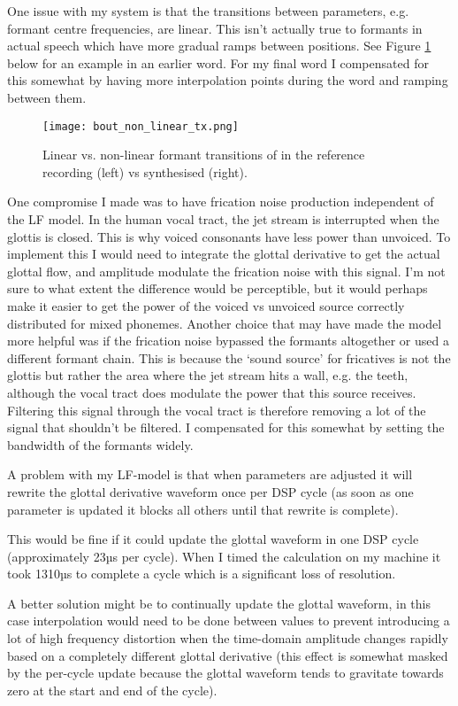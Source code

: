 One issue with my system is that the transitions between parameters, e.g. formant centre frequencies, are linear. This isn't actually true to formants in actual speech which have more gradual ramps between positions. See Figure \ref{fig:bout_non_linear_tx} below for an example in an earlier word. For my final word I compensated for this somewhat by having more interpolation points during the word and ramping between them. 
%
\begin{figure}[H] 
	\texttt{[image: bout\_non\_linear\_tx.png]}
	\caption{Linear vs. non-linear formant transitions of  in the reference recording (left) vs synthesised (right).}
	\label{fig:bout_non_linear_tx}
\end{figure}
%
One compromise I made was to have frication noise production independent of the LF model. In the human vocal tract, the jet stream is interrupted when the glottis is closed. This is why voiced consonants have less power than unvoiced. To implement this I would need to integrate the glottal derivative to get the actual glottal flow, and amplitude modulate the frication noise with this signal. I'm not sure to what extent the difference would be perceptible, but it would perhaps make it easier to get the power of the voiced vs unvoiced source correctly distributed for mixed phonemes. Another choice that may have made the model more helpful was if the frication noise bypassed the formants altogether or used a different formant chain. This is because the `sound source' for fricatives is not the glottis but rather the area where the jet stream hits a wall, e.g. the teeth, although the vocal tract does modulate the power that this source receives. Filtering this signal through the vocal tract is therefore removing a lot of the signal that shouldn't be filtered. I compensated for this somewhat by setting the bandwidth of the formants widely.

A problem with my LF-model is that when parameters are adjusted it will rewrite the glottal derivative waveform once per DSP cycle (as soon as one parameter is updated it blocks all others until that rewrite is complete).

This would be fine if it could update the glottal waveform in one DSP cycle (approximately 23µs per cycle). When I timed the calculation on my machine it took 1310µs to complete a cycle which is a significant loss of resolution.

A better solution might be to continually update the glottal waveform, in this case interpolation would need to be done between values to prevent introducing a lot of high frequency distortion when the time-domain amplitude changes rapidly based on a completely different glottal derivative (this effect is somewhat masked by the per-cycle update because the glottal waveform tends to gravitate towards zero at the start and end of the cycle).

